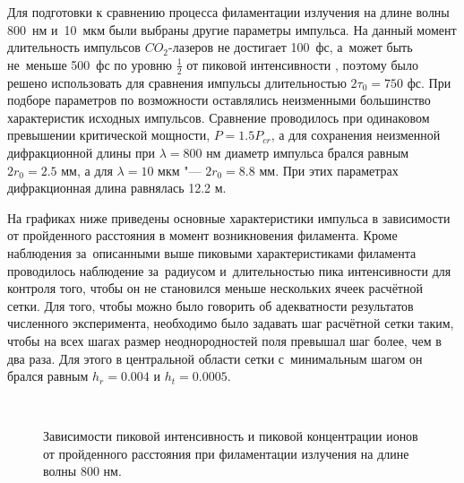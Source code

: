 Для подготовки к сравнению процесса филаментации излучения на длине волны 800~нм и~10~мкм были выбраны другие параметры импульса.
На данный момент длительность импульсов $CO_2$-лазеров не достигает 100~фс, а~может быть не~меньше 500~фс по уровню $\frac{1}{2}$ от пиковой интенсивности \cite{PicosecondAmplifier2007},
поэтому было решено использовать для сравнения импульсы длительностью $2 \tau_0 = 750 \textrm{ фс}$.
При подборе параметров по возможности оставлялись неизменными большинство характеристик исходных импульсов.
Сравнение проводилось при одинаковом превышении критической мощности, \mbox{$P = 1.5P_{cr}$},
а для сохранения неизменной дифракционной длины при $\lambda = 800 \textrm{ нм}$ диаметр импульса брался равным $2 r_0 = 2.5 \textrm{ мм}$,
а для $\lambda = 10 \textrm{ мкм}$ "--- $2 r_0 = 8.8 \textrm{ мм}$. При этих параметрах дифракционная длина равнялась 12.2 м.

На графиках ниже приведены основные характеристики импульса в зависимости от пройденного расстояния в момент возникновения филамента.
Кроме наблюдения за~описанными выше пиковыми характеристиками филамента проводилось наблюдение за~радиусом и~длительностью пика интенсивности для контроля
того, чтобы он не становился меньше нескольких ячеек расчётной сетки. Для того, чтобы можно было говорить об адекватности результатов численного эксперимента,
необходимо было задавать шаг расчётной сетки таким, чтобы на всех шагах размер неоднородностей поля превышал шаг более, чем в два раза.
Для этого в центральной области сетки с~минимальным шагом он брался равным $h_r = 0.004$ и $h_t = 0.0005$.


\begin{figure}[H]
    \begin{center}
        \begin{minipage}{\minipagewidthtwo}
        \end{minipage}
        \hfill
        \begin{minipage}{\minipagewidthtwo}
        \end{minipage}
        \\[1ex]
        \caption{Зависимости пиковой интенсивность и пиковой концентрации ионов от пройденного расстояния при филаментации излучения на длине волны 800 нм.}
        \label{fig:Pulses800INe}
    \end{center}
\end{figure}

